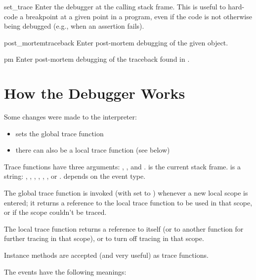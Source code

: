 \begin{funcdesc}{set_trace}{}
Enter the debugger at the calling stack frame.  This is useful to
hard-code a breakpoint at a given point in a program, even if the code
is not otherwise being debugged (e.g., when an assertion fails).
\end{funcdesc}

\begin{funcdesc}{post_mortem}{traceback}
Enter post-mortem debugging of the given  object.
\end{funcdesc}

\begin{funcdesc}{pm}{}
Enter post-mortem debugging of the traceback found in
.
\end{funcdesc}

\section{How the Debugger Works \label{debugger-hooks}}

Some changes were made to the interpreter:

\begin{itemize}
\item {} sets the global trace function
\item there can also be a local trace function (see below)
\end{itemize}

Trace functions have three arguments: , , and
.  is the current stack frame.   is a
string: , , , ,
 , , or . 
 depends on the event type.

The global trace function is invoked (with  set to
) whenever a new local scope is entered; it returns
a reference to the local trace function to be used in that scope, or
 if the scope couldn't be traced.

The local trace function  returns a reference to itself (or to
another function for further tracing in that scope), or  to
turn off tracing in that scope.

Instance methods are accepted (and very useful) as trace functions.

The events have the following meanings:

